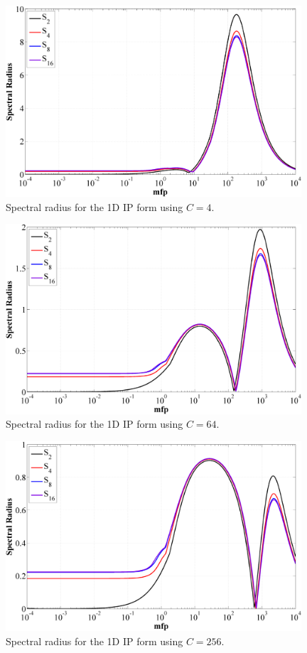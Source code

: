 \begin{figure}
\label{fig::1D_IP_c=4}
\centering
\includegraphics[width=0.98\textwidth]{figures/appendices/DSA_1D_SI_IP_C=4.png}
\caption{Spectral radius for the 1D IP form using $C=4$.}
\end{figure}

\begin{figure}
\label{fig::1D_IP_c=64}
\centering
\includegraphics[width=0.98\textwidth]{figures/appendices/DSA_1D_SI_IP_C=64.png}
\caption{Spectral radius for the 1D IP form using $C=64$.}
\end{figure}

\begin{figure}
\label{fig::1D_IP_c=256}
\centering
\includegraphics[width=0.98\textwidth]{figures/appendices/DSA_1D_SI_IP_C=256.png}
\caption{Spectral radius for the 1D IP form using $C=256$.}
\end{figure}

